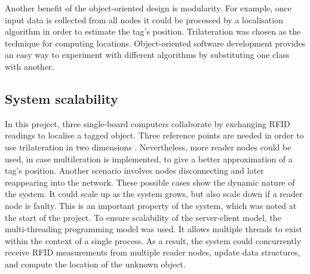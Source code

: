 Another benefit of the object-oriented design is modularity. For example, once input data is collected from all nodes it could be processed by a localisation algorithm in order to estimate the tag's position. Trilateration was chosen as the technique for computing locations. Object-oriented software development provides an easy way to experiment with different algorithms by substituting one class with another.

\subsection{System scalability}
\label{subsec:sysscal}

In this project, three single-board computers collaborate by exchanging RFID readings to localise a tagged object. Three reference points are needed in order to use trilateration in two dimensions  \cite{Zhang2009}. Nevertheless, more reader nodes could be used, in case multileration is implemented, to give a better approximation of a tag's position. Another scenario involves nodes disconnecting and later reappearing into the network. These possible cases show the dynamic nature of the system. It could scale up as the system grows, but also scale down if a reader node is faulty. This is an important property of the system, which was noted at the start of the project. To ensure scalability of the server-client model, the multi-threading programming model was used. It allows multiple threads to exist within the context of a single process. As a result, the system could concurrently receive RFID measurements from multiple reader nodes, update data structures, and compute the location of the unknown object.



